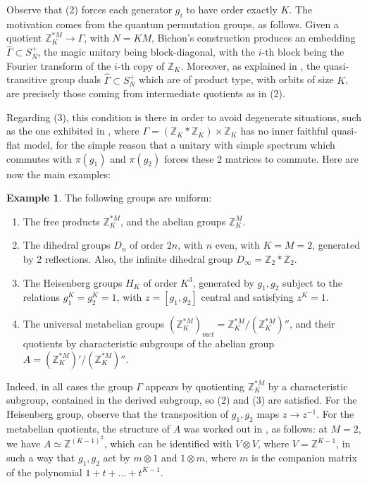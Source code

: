 \documentclass[12pt]{amsart}
\theoremstyle{definition}
\newtheorem{example}[theorem]{Example}
\begin{document}
Observe that (2) forces each generator $g_i$ to have order exactly $K$. The motivation comes from the quantum permutation groups, as follows. Given a quotient $\mathbb Z_K^{*M}\to\Gamma$, with $N=KM$, Bichon's construction \cite{bic} produces an embedding $\widehat{\Gamma}\subset S_N^+$, the magic unitary being block-diagonal, with the $i$-th block being the Fourier transform of the $i$-th copy of $\mathbb Z_K$. Moreover, as explained in \cite{bc2,bfr}, the quasi-transitive group duals $\widehat{\Gamma}\subset S_N^+$ which are of product type, with orbits of size $K$, are precisely those coming from intermediate quotients as in (2).

Regarding (3), this condition is there in order to avoid degenerate situations, such as the one exhibited in \cite{bfr}, where $\Gamma=(\mathbb Z_K*\mathbb Z_K)\times\mathbb Z_K$ has no inner faithful quasi-flat model, for the simple reason that a unitary with simple spectrum which commutes with $\pi(g_1)$ and $\pi(g_2)$ forces these 2 matrices to commute. Here are now the main examples:

\begin{example}
The following groups are uniform:
\begin{enumerate}
\item The free products $\mathbb Z_K^{*M}$, and the abelian groups $\mathbb Z_K^M$.

\item The dihedral groups $D_n$ of order $2n$, with $n$ even, with $K=M=2$, generated by 2 reflections. Also, the infinite dihedral group $D_\infty=\mathbb Z_2*\mathbb Z_2$.

\item The Heisenberg groups $H_K$ of order $K^3$, generated by $g_1,g_2$ subject to the relations $g_1^K=g_2^K=1$, with $z=[g_1,g_2]$ central and satisfying $z^K=1$.

\item The universal metabelian groups $(\mathbb Z_K^{*M})_{met}=\mathbb Z_K^{*M}/(\mathbb Z_K^{*M})''$, and their quotients by characteristic subgroups of the abelian group $A=(\mathbb Z_K^{*M})'/(\mathbb Z_K^{*M})''$.
\end{enumerate}
\end{example}

Indeed, in all cases the group $\Gamma$ appears by quotienting $\mathbb Z_K^{*M}$ by a characteristic subgroup, contained in the derived subgroup, so (2) and (3) are satisfied. For the Heisenberg group, observe that the transposition of $g_1,g_2$ maps $z\to z^{-1}$. For the metabelian quotients, the structure of $A$ was worked out in \cite{bc2}, as follows: at $M=2$, we have $A\simeq\mathbb Z^{(K-1)^2}$, which can be identified with $V\otimes V$, where $V=\mathbb Z^{K-1}$, in such a way that $g_1,g_2$ act by $m\otimes1$ and $1\otimes m$, where $m$ is the companion matrix of the polynomial $1+t+\ldots+t^{K-1}$.
\end{document}
